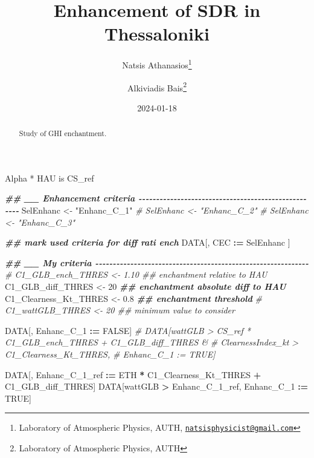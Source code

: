 \documentclass[
  10pt,
  a4paper,oneside]{article}
\title{Enhancement of SDR in Thessaloniki}
\author{Natsis Athanasios\footnote{Laboratory of Atmospheric Physics, AUTH, \href{mailto:natsisphysicist@gmail.com}{\nolinkurl{natsisphysicist@gmail.com}}} \and Alkiviadis Bais\footnote{Laboratory of Atmospheric Physics, AUTH}}
\date{2024-01-18}
\newenvironment{Shaded}{\begin{snugshade}}{\end{snugshade}}
\newcommand{\CommentTok}[1]{\textcolor[rgb]{0.56,0.35,0.01}{\textit{#1}}}
\newcommand{\ConstantTok}[1]{\textcolor[rgb]{0.56,0.35,0.01}{#1}}
\newcommand{\DecValTok}[1]{\textcolor[rgb]{0.00,0.00,0.81}{#1}}
\newcommand{\DocumentationTok}[1]{\textcolor[rgb]{0.56,0.35,0.01}{\textbf{\textit{#1}}}}
\newcommand{\FloatTok}[1]{\textcolor[rgb]{0.00,0.00,0.81}{#1}}
\newcommand{\NormalTok}[1]{#1}
\newcommand{\OtherTok}[1]{\textcolor[rgb]{0.56,0.35,0.01}{#1}}
\newcommand{\SpecialCharTok}[1]{\textcolor[rgb]{0.81,0.36,0.00}{\textbf{#1}}}
\newcommand{\StringTok}[1]{\textcolor[rgb]{0.31,0.60,0.02}{#1}}
\begin{document}
\maketitle
\begin{abstract}
Study of GHI enchantment.
\end{abstract}

{
\hypersetup{linkcolor=}
\setcounter{tocdepth}{4}
\tableofcontents
}
Alpha * HAU is CS\_ref

\begin{Shaded}
\begin{Highlighting}[]
\DocumentationTok{\#\# \_\_ Enhancement criteria  {-}{-}{-}{-}{-}{-}{-}{-}{-}{-}{-}{-}{-}{-}{-}{-}{-}{-}{-}{-}{-}{-}{-}{-}{-}{-}{-}{-}{-}{-}{-}{-}{-}{-}{-}{-}{-}{-}{-}{-}{-}{-}{-}{-}{-}{-}{-}{-}{-}{-}{-}{-}}
\NormalTok{SelEnhanc }\OtherTok{\textless{}{-}} \StringTok{"Enhanc\_C\_1"}
\CommentTok{\# SelEnhanc \textless{}{-} "Enhanc\_C\_2"}
\CommentTok{\# SelEnhanc \textless{}{-} "Enhanc\_C\_3"}

\DocumentationTok{\#\# mark used criteria for diff rati ench}
\NormalTok{DATA[, CEC }\SpecialCharTok{:=}\NormalTok{ SelEnhanc ]}

\DocumentationTok{\#\# \_\_ My criteria  {-}{-}{-}{-}{-}{-}{-}{-}{-}{-}{-}{-}{-}{-}{-}{-}{-}{-}{-}{-}{-}{-}{-}{-}{-}{-}{-}{-}{-}{-}{-}{-}{-}{-}{-}{-}{-}{-}{-}{-}{-}{-}{-}{-}{-}{-}{-}{-}{-}{-}{-}{-}{-}{-}{-}{-}{-}{-}{-}{-}{-}}
\CommentTok{\# C1\_GLB\_ench\_THRES     \textless{}{-}  1.10 \#\# enchantment relative to HAU}
\NormalTok{C1\_GLB\_diff\_THRES     }\OtherTok{\textless{}{-}} \DecValTok{20}    \DocumentationTok{\#\# enchantment absolute diff to HAU}
\NormalTok{C1\_Clearness\_Kt\_THRES }\OtherTok{\textless{}{-}}  \FloatTok{0.8}  \DocumentationTok{\#\# enchantment threshold}
\CommentTok{\# C1\_wattGLB\_THRES      \textless{}{-} 20    \#\# minimum value to consider}

\NormalTok{DATA[, Enhanc\_C\_1 }\SpecialCharTok{:=} \ConstantTok{FALSE}\NormalTok{]}
\CommentTok{\# DATA[wattGLB           \textgreater{} CS\_ref * C1\_GLB\_ench\_THRES + C1\_GLB\_diff\_THRES \&}
\CommentTok{\#      ClearnessIndex\_kt \textgreater{} C1\_Clearness\_Kt\_THRES,}
\CommentTok{\#      Enhanc\_C\_1 := TRUE]}

\NormalTok{DATA[, Enhanc\_C\_1\_ref }\SpecialCharTok{:=}\NormalTok{ ETH }\SpecialCharTok{*}\NormalTok{ C1\_Clearness\_Kt\_THRES }\SpecialCharTok{+}\NormalTok{ C1\_GLB\_diff\_THRES]}
\NormalTok{DATA[wattGLB }\SpecialCharTok{\textgreater{}}\NormalTok{ Enhanc\_C\_1\_ref,}
\NormalTok{     Enhanc\_C\_1 }\SpecialCharTok{:=} \ConstantTok{TRUE}\NormalTok{]}


\end{Highlighting}
\end{Shaded}
\end{document}
